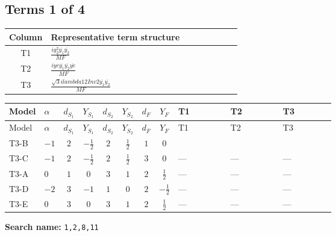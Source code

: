 \documentclass[8pt]{article}
\begin{document}
\begin{landscape}
\subsection*{Terms 1 of 4}
\begin{center}
\begin{tabular}{@{}c >{\raggedright\arraybackslash}p{0.82\linewidth}@{}}
\toprule
Column & Representative term structure \\
\midrule
T1 & \(\displaystyle \frac{i g_{2}^{2} \overline{y_{1}} \overline{y_{2}}}{MF}\) \\
\midrule
T2 & \(\displaystyle \frac{i ye \overline{y_{1}} \overline{y_{2}} \overline{ye}}{MF}\) \\
\midrule
T3 & \(\displaystyle \frac{\sqrt{3} i lambda12Inv2 \overline{y_{1}} \overline{y_{2}}}{MF}\) \\
\midrule
\bottomrule
\end{tabular}
\end{center}
\smallskip
\tiny
\begin{longtable}{@{}llcccccc >{\raggedright\arraybackslash}p{0.21\linewidth} >{\raggedright\arraybackslash}p{0.21\linewidth} >{\raggedright\arraybackslash}p{0.21\linewidth}@{}}
\toprule
Model & $\alpha$ & $d_{S_1}$ & $Y_{S_1}$ & $d_{S_2}$ & $Y_{S_2}$ & $d_F$ & $Y_F$ & T1 & T2 & T3 \\
\midrule
\endfirsthead
\toprule
Model & $\alpha$ & $d_{S_1}$ & $Y_{S_1}$ & $d_{S_2}$ & $Y_{S_2}$ & $d_F$ & $Y_F$ & T1 & T2 & T3 \\
\midrule
\endhead
T3-B & $-1$ & $2$ & $-\frac{1}{2}$ & $2$ & $\frac{1}{2}$ & $1$ & $0$ & \scriptsize\adjustbox{max width=\linewidth}{$\begin{gathered} \frac{3 i g_{2}^{2} \overline{y_{1}} \overline{y_{2}}}{8 MF}\end{gathered}$} & \scriptsize\adjustbox{max width=\linewidth}{$\begin{gathered} - \frac{i ye \overline{y_{1}} \overline{y_{2}} \overline{ye}}{8 MF}\end{gathered}$} & \scriptsize\adjustbox{max width=\linewidth}{$\begin{gathered} \frac{\sqrt{3} i lambda12Inv2 \overline{y_{1}} \overline{y_{2}}}{6 MF}\end{gathered}$} \\
\midrule
T3-C & $-1$ & $2$ & $-\frac{1}{2}$ & $2$ & $\frac{1}{2}$ & $3$ & $0$ & --- & --- & --- \\
\midrule
T3-A & $0$ & $1$ & $0$ & $3$ & $1$ & $2$ & $\frac{1}{2}$ & --- & --- & --- \\
\midrule
T3-D & $-2$ & $3$ & $-1$ & $1$ & $0$ & $2$ & $-\frac{1}{2}$ & --- & --- & --- \\
\midrule
T3-E & $0$ & $3$ & $0$ & $3$ & $1$ & $2$ & $\frac{1}{2}$ & --- & --- & --- \\
\midrule
\bottomrule
\end{longtable}
\clearpage
\noindent\textbf{Search name: }\texttt{1,2,8,11}\par\smallskip

\end{landscape}
\end{document}
